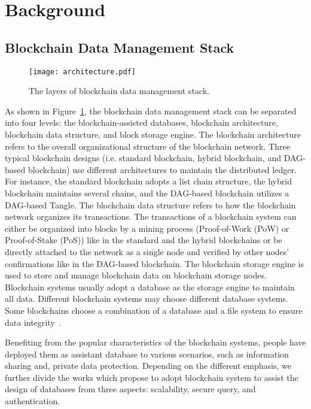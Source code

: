 \documentclass[acmsmall]{acmart}
\begin{document}
%

\section{Background}
\label{sec:Background}

\subsection{Blockchain Data Management Stack}

\begin{figure}[ht]
  \centering
  \texttt{[image: architecture.pdf]}
  \caption{The layers of blockchain data management stack.}
  \label{pic1}
\end{figure}

As shown in Figure~\ref{pic1}, the blockchain data management stack can be separated into four levels: the blockchain-assisted databases, blockchain architecture, blockchain data structure, and block storage engine. The blockchain architecture refers to the overall organizational structure of the blockchain network. Three typical blockchain designs (i.e. standard blockchain, hybrid blockchain, and DAG-based blockchain) use different architectures to maintain the distributed ledger. For instance, the standard blockchain adopts a list chain structure, the hybrid blockchain maintains several chains, and the DAG-based blockchain utilizes a DAG-based Tangle. The blockchain data structure refers to how the blockchain network organizes its transactions. The transactions of a blockchain system can either be organized into blocks by a mining process (Proof-of-Work (PoW) or Proof-of-Stake (PoS)) like in the standard and the hybrid blockchains or be directly attached to the network as a single node and verified by other nodes' confirmations like in the DAG-based blockchain. The blockchain storage engine is used to store and manage blockchain data on blockchain storage nodes. Blockchain systems usually adopt a database as the storage engine to maintain all data. Different blockchain systems may choose different database systems. Some blockchains choose a combination of a database and a file system to ensure data integrity~\cite{nakamoto2019bitcoin}.



Benefiting from the popular characteristics of the blockchain systems, people have deployed them as assistant database to various scenarios, such as information sharing and, private data protection. Depending on the different emphasis, we further divide the works which propose to adopt blockchain system to assist the design of databases from three aspects: scalability, secure query, and authentication.
\end{document}
